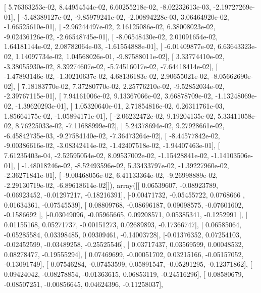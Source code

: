 \documentclass{article}
\begin{document}
       [  5.76363253e-02,   8.44954544e-02,   6.60255218e-02,
         -8.02232613e-03,  -2.19727269e-01],
       [ -5.48389127e-02,  -9.85979241e-02,  -2.00894228e-03,
          3.06464920e-02,  -1.66525610e-01],
       [ -2.96244497e-02,   2.16125086e-02,   6.38008023e-02,
         -9.02436126e-02,  -2.66548745e-01],
       [ -8.06548430e-02,   2.01091654e-02,   1.64181144e-02,
          2.08782064e-03,  -1.61554888e-01],
       [ -6.01409877e-02,   6.63643323e-02,   1.14097734e-02,
          1.04568026e-01,  -9.87588011e-02],
       [  3.33774410e-02,  -3.38055930e-02,   8.39274607e-02,
         -5.74516017e-02,  -7.64418414e-02],
       [ -1.47893146e-02,  -1.30210637e-02,   4.68136183e-02,
          2.90655021e-02,  -8.05662690e-02],
       [  7.18183770e-02,   7.37280770e-02,   2.25776210e-02,
         -9.52852034e-02,  -2.39767115e-01],
       [  7.94161006e-02,   9.13367066e-02,   3.66878709e-02,
         -1.13248069e-02,  -1.39620293e-01],
       [  1.05320640e-01,   2.71854816e-02,   6.26311761e-03,
          1.85664175e-02,  -1.05894171e-01],
       [ -2.06232472e-02,   9.19204135e-02,   5.33411058e-02,
          8.76225033e-02,  -7.11688999e-02],
       [  5.24378694e-02,   9.27928661e-02,  -6.45842735e-03,
         -9.27584140e-02,  -7.36473264e-02],
       [ -8.44577842e-02,  -9.00386616e-02,  -3.08342414e-02,
         -1.42407518e-02,  -1.94407463e-01],
       [  7.61235403e-04,  -2.52595054e-02,   8.09537002e-02,
         -1.15428841e-02,  -1.14103506e-01],
       [ -1.48018246e-02,  -8.52493596e-02,   5.33433797e-02,
         -1.39227960e-02,  -2.36271841e-01],
       [ -9.00468056e-02,   6.41133364e-02,  -9.26998889e-02,
         -2.29130719e-02,  -6.89618614e-02]]), array([[ 0.06539607, -0.08923789, -0.06923452, -0.01297217, -0.18216391],
       [-0.00471732, -0.05455722,  0.0768666 ,  0.01634361, -0.07545539],
       [ 0.08809768, -0.08696187,  0.09098575, -0.07601602, -0.1586692 ],
       [-0.03049096, -0.05965665,  0.09208571,  0.05385341, -0.1252991 ],
       [ 0.01155168,  0.05271737, -0.00151273,  0.02689893, -0.17366747],
       [ 0.06585064, -0.05285584,  0.03398485,  0.09309461, -0.14003728],
       [-0.01376352,  0.07254103, -0.02452599, -0.03489258, -0.25525546],
       [ 0.03717437,  0.03569599,  0.00048532,  0.08278477, -0.19555294],
       [ 0.07469699, -0.00051702,  0.03215166, -0.05157052, -0.13091749],
       [ 0.07546284, -0.07453599,  0.05891547, -0.05291295, -0.12371862],
       [ 0.09424042, -0.08278854, -0.01363615,  0.06853119, -0.24516296],
       [ 0.08580679, -0.08507251, -0.00856645,  0.04624396, -0.11258037],
\end{document}
